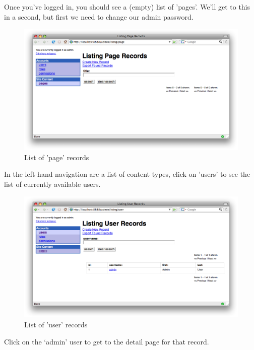 Once you've logged in, you should see a (empty) list of 'pages'. We'll get to
this in a second, but first we need to change our admin password.

\begin{figure}[ht]
\centering
\includegraphics[width=1\textwidth]{images/admin-intro/03-page-listing.png}
\caption{List of 'page' records}
\end{figure}

In the left-hand navigation are a list of content types, click on 'users' to
see the list of currently available users.

\begin{figure}[ht]
\centering
\includegraphics[width=1\textwidth]{images/admin-intro/04-user-listing.png}
\caption{List of 'user' records}
\end{figure}

Click on the `admin' user to get to the detail page for that record.

